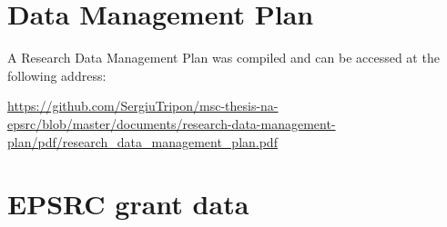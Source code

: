 {}
\renewcommand*{\arraystretch}{1.5}

\appendix

\chapter{Data Management Plan}
\label{appendix:data_management_plan}

A Research Data Management Plan was compiled and can be accessed at the following address:

\url{https://github.com/SergiuTripon/msc-thesis-na-epsrc/blob/master/documents/research-data-management-plan/pdf/research_data_management_plan.pdf}

\chapter{EPSRC grant data}
\label{appendix:epsrc_grant_data}

